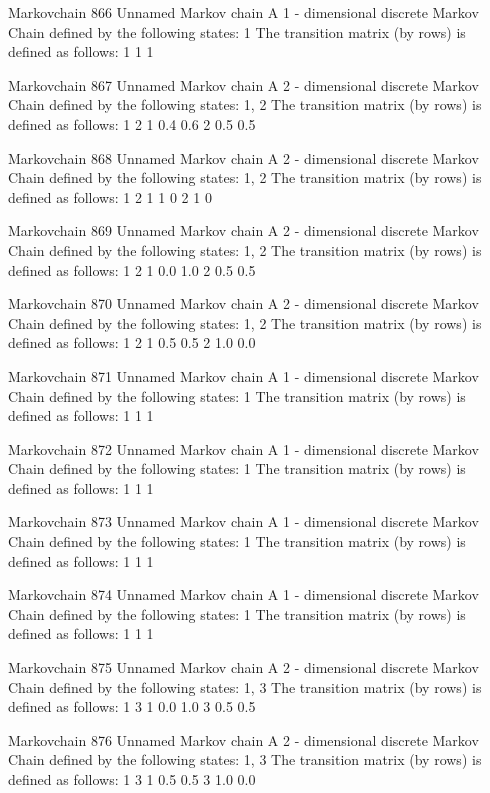 \documentclass[
  nojss]{jss}
\begin{document}
\begin{CodeChunk}
\begin{CodeOutput}
Markovchain  866 
Unnamed Markov chain 
 A  1 - dimensional discrete Markov Chain defined by the following states: 
 1 
 The transition matrix  (by rows)  is defined as follows: 
  1
1 1

Markovchain  867 
Unnamed Markov chain 
 A  2 - dimensional discrete Markov Chain defined by the following states: 
 1, 2 
 The transition matrix  (by rows)  is defined as follows: 
    1   2
1 0.4 0.6
2 0.5 0.5

Markovchain  868 
Unnamed Markov chain 
 A  2 - dimensional discrete Markov Chain defined by the following states: 
 1, 2 
 The transition matrix  (by rows)  is defined as follows: 
  1 2
1 1 0
2 1 0

Markovchain  869 
Unnamed Markov chain 
 A  2 - dimensional discrete Markov Chain defined by the following states: 
 1, 2 
 The transition matrix  (by rows)  is defined as follows: 
    1   2
1 0.0 1.0
2 0.5 0.5

Markovchain  870 
Unnamed Markov chain 
 A  2 - dimensional discrete Markov Chain defined by the following states: 
 1, 2 
 The transition matrix  (by rows)  is defined as follows: 
    1   2
1 0.5 0.5
2 1.0 0.0

Markovchain  871 
Unnamed Markov chain 
 A  1 - dimensional discrete Markov Chain defined by the following states: 
 1 
 The transition matrix  (by rows)  is defined as follows: 
  1
1 1

Markovchain  872 
Unnamed Markov chain 
 A  1 - dimensional discrete Markov Chain defined by the following states: 
 1 
 The transition matrix  (by rows)  is defined as follows: 
  1
1 1

Markovchain  873 
Unnamed Markov chain 
 A  1 - dimensional discrete Markov Chain defined by the following states: 
 1 
 The transition matrix  (by rows)  is defined as follows: 
  1
1 1

Markovchain  874 
Unnamed Markov chain 
 A  1 - dimensional discrete Markov Chain defined by the following states: 
 1 
 The transition matrix  (by rows)  is defined as follows: 
  1
1 1

Markovchain  875 
Unnamed Markov chain 
 A  2 - dimensional discrete Markov Chain defined by the following states: 
 1, 3 
 The transition matrix  (by rows)  is defined as follows: 
    1   3
1 0.0 1.0
3 0.5 0.5

Markovchain  876 
Unnamed Markov chain 
 A  2 - dimensional discrete Markov Chain defined by the following states: 
 1, 3 
 The transition matrix  (by rows)  is defined as follows: 
    1   3
1 0.5 0.5
3 1.0 0.0


\end{CodeOutput}
\end{CodeChunk}
\end{document}
